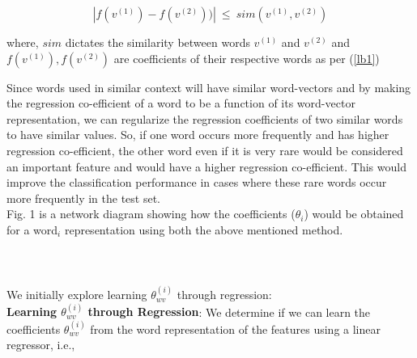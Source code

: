 \begin{equation}
|f(v^{(1)}) - f(v^{(2)}))|\ \leq\ sim(v^{(1)}, v^{(2)})
\end{equation}

where, $sim$ dictates the similarity between words $v^{(1)}$ and $v^{(2)}$ and $ f(v^{(1)}), f(v^{(2)})$ are coefficients of their respective words as per (\ref{lb1})


Since words used in similar context will have similar word-vectors and by making the regression co-efficient of a word to be a function of its word-vector representation, we can regularize the regression coefficients of two similar words to have similar values. So, if one word occurs more frequently and has higher regression co-efficient, the other word even if it is very rare would be considered an important feature and would have a higher regression co-efficient. This would improve the classification performance in cases where these rare words occur more frequently in the test set.\\


\noindent Fig. 1 is a network diagram showing how the coefficients ($\theta_{i}$) would be obtained for a word$_{i}$ representation using both the above mentioned method.\\\\\\\\

\noindent We initially explore learning $\theta_{wv}^{(i)}$ through regression:\\



\noindent\textbf{Learning $\theta_{wv}^{(i)}$ through Regression}: We determine if we can learn the coefficients $\theta_{wv}^{(i)}$ from the word representation of the features using a linear regressor, i.e., 

